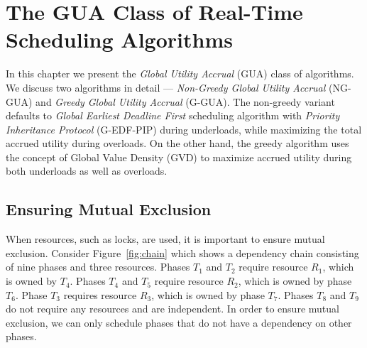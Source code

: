\documentclass[12pt,dvips]{report}
\begin{document}
\chapter{The GUA Class of Real-Time Scheduling Algorithms}\label{chap:algorithm}

In this chapter we present the \textit{Global Utility Accrual} (GUA) class of algorithms. We discuss two algorithms in detail --- \textit{Non-Greedy Global Utility Accrual} (NG-GUA) and \textit{Greedy Global Utility Accrual} (G-GUA). The non-greedy variant defaults to \textit{Global Earliest Deadline First} scheduling algorithm with \textit{Priority Inheritance Protocol} (G-EDF-PIP) during underloads, while maximizing the total accrued utility during overloads. On the other hand, the greedy algorithm uses the concept of Global Value Density (GVD) to maximize accrued utility during both underloads as well as overloads.


\section{Ensuring Mutual Exclusion}\label{sec:algo:me}


When resources, such as locks, are used, it is important to ensure mutual exclusion. Consider Figure~\ref{fig:chain} which shows a dependency chain consisting of nine phases and three resources. Phases $T_1$ and $T_2$ require resource $R_1$, which is owned by $T_4$. Phases $T_4$ and $T_5$ require resource $R_2$, which is owned by phase $T_6$. Phase $T_3$ requires resource $R_3$, which is owned by phase $T_7$. Phases $T_8$ and $T_9$ do not require any resources and are independent. In order to ensure mutual exclusion, we can only schedule phases that do not have a dependency on other phases.
\end{document}

